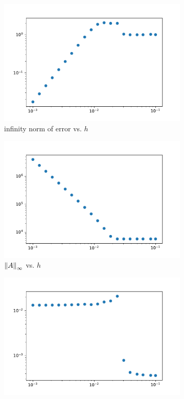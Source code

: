 \documentclass[10pt]{article}
\begin{document}
\begin{solution}[Solution]
\begin{itemize}
\begin{figure}[H]\centering
\begin{subfigure}{.3\textwidth}
    \includegraphics[width=\textwidth]{code/error.pdf}
    \caption{infinity norm of error vs. \( h \)}
\end{subfigure}
\begin{subfigure}{.3\textwidth}
    \includegraphics[width=\textwidth]{code/Ah.pdf}
    \caption{\( \left\lVert A\right\rVert_\infty \) vs. \( h \)}
\end{subfigure}
\begin{subfigure}{.3\textwidth}
    \includegraphics[width=\textwidth]{code/Ahinv.pdf}

\end{subfigure}
\end{figure}
\end{itemize}
\end{solution}
\end{document}

